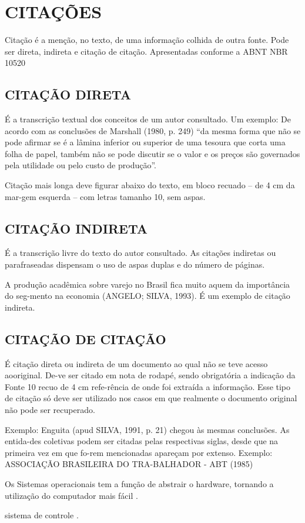 %
%

\chapter{CITAÇÕES}

Citação é a menção, no texto, de uma informação colhida de outra fonte. Pode ser direta, indireta e citação de citação. Apresentadas conforme a ABNT NBR 10520

\section{CITAÇÃO DIRETA}

É a transcrição textual dos conceitos de um autor consultado. Um
exemplo: De acordo com as conclusões de Marshall (1980, p. 249) “da mesma forma que não se pode afirmar se é a lâmina inferior ou superior de uma tesoura que corta uma folha de papel, também não se pode discutir se o valor e os preços são governados pela utilidade ou pelo custo de produção”. 

Citação mais longa deve figurar abaixo do texto, em bloco recuado
– de 4 cm da mar-gem esquerda – com letras tamanho 10, sem aspas.

\section{CITAÇÃO INDIRETA}

É a transcrição livre do texto do autor consultado. As citações
indiretas ou parafraseadas dispensam o uso de aspas duplas e do número de páginas.

A produção acadêmica sobre varejo no Brasil fica muito aquem da
importância do seg-mento na economia (ANGELO; SILVA, 1993). É um exemplo de citação indireta.

\section{CITAÇÃO DE CITAÇÃO}

É citação direta ou indireta de um documento ao qual não se teve
acesso aooriginal. De-ve ser citado em nota de rodapé, sendo obrigatória a indicação da Fonte 10 recuo de 4 cm refe-rência de onde foi extraída a informação. Esse tipo de citação só deve ser utilizado nos casos em que realmente o documento original não pode ser recuperado. 

Exemplo: Enguita (apud SILVA, 1991, p. 21) chegou às mesmas
conclusões. As entida-des coletivas podem ser citadas pelas respectivas siglas, desde que na primeira vez em que fo-rem mencionadas apareçam por extenso. Exemplo: ASSOCIAÇÃO BRASILEIRA DO TRA-BALHADOR - ABT (1985)


Os Sistemas operacionais tem a função de abstrair o hardware, tornando a utilização do computador mais fácil \cite{tanenbaum1995sistemas}.

sistema de controle \cite{de2017sistema}.

